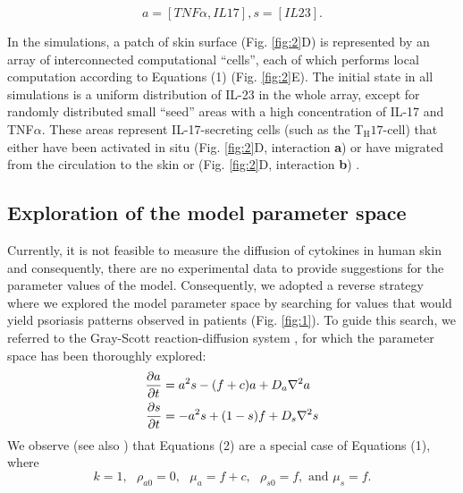 \[a=[TNF\alpha, IL17], s=[IL23].\]

In the simulations, a patch of skin surface (Fig. \ref{fig:2}D) is represented by an array of interconnected computational “cells”, each of which performs local computation according to Equations (1) (Fig. \ref{fig:2}E). The initial state in all simulations is a uniform distribution of IL-23 in the whole array, except for randomly distributed small “seed” areas with a high concentration of IL-17 and TNF$\alpha$. These areas represent IL-17-secreting cells (such as the T$_{\text{H}}17$-cell) that either have been activated in situ (Fig. \ref{fig:2}D, interaction \textbf{a}) or have migrated from the circulation to the skin or (Fig. \ref{fig:2}D, interaction \textbf{b}) \citep{krueger2012}. 

\subsection{Exploration of the model parameter space}
Currently, it is not feasible to measure the diffusion of cytokines in human skin and consequently, there are no experimental data to provide suggestions for the parameter values of the model. Consequently, we adopted a reverse strategy where we explored the model parameter space by searching for values that would yield psoriasis patterns observed in patients (Fig. \ref{fig:1}). To guide this search, we referred to the Gray-Scott reaction-diffusion system \citep{gray1984}, for which the parameter space has been thoroughly explored:
\begin{equation}
	\begin{aligned} \label{eq:gsPsoriasis}
	\frac{\partial a}{\partial t} &= a^2s-(f+c)a+ D_a \nabla^2 a \\
	\frac{\partial s}{\partial t} &= -a^2s+(1-s)f + D_s \nabla^2 s
	\end{aligned}
\end{equation}
We observe (see also \citep{yamamoto2010, yamamoto2011}) that Equations (2) are a special case of Equations (1), where
\[ k=1,\text{   }\rho_{a0}=0,\text{   }\mu_a=f+c,\text{   }\rho_{s0}=f,\text{ and }\mu_s=f.\]
